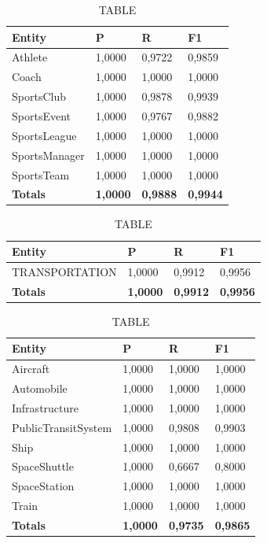 \documentclass[thesis=M,english]{FITthesis}[2018/05/30]
\begin{document}
	\begin{table}[H]\centering
		\caption{TABLE}
		\label{}
		\begin{tabular}{|l|l|l|l|}
			\hline {\textbf{Entity}} & {\textbf{P}} & {\textbf{R}} & {\textbf{F1}}\\\hline
				Athlete & 1,0000 & 0,9722 & 0,9859\\
				Coach & 1,0000 & 1,0000 & 1,0000\\
				SportsClub & 1,0000 & 0,9878 & 0,9939\\
				SportsEvent & 1,0000 & 0,9767 & 0,9882\\
				SportsLeague & 1,0000 & 1,0000 & 1,0000\\
				SportsManager & 1,0000 & 1,0000 & 1,0000\\				
				SportsTeam & 1,0000 & 1,0000 & 1,0000\\\hline
				\textbf{Totals} & \textbf{1,0000} & \textbf{0,9888} & \textbf{0,9944}\\\hline
		\end{tabular}
	\end{table}	

	\begin{table}[H]\centering
		\caption{TABLE}
		\label{}
		\begin{tabular}{|l|l|l|l|}
			\hline {\textbf{Entity}} & {\textbf{P}} & {\textbf{R}} & {\textbf{F1}}\\\hline
				TRANSPORTATION & 1,0000 & 0,9912 & 0,9956\\\hline
				\textbf{Totals} & \textbf{1,0000} & \textbf{0,9912} & \textbf{0,9956}\\\hline
		\end{tabular}
	\end{table}
	
	
	\begin{table}[H]\centering
		\caption{TABLE}
		\label{}
		\begin{tabular}{|l|l|l|l|}
			\hline {\textbf{Entity}} & {\textbf{P}} & {\textbf{R}} & {\textbf{F1}}\\\hline
				Aircraft & 1,0000 & 1,0000 & 1,0000\\
				Automobile & 1,0000 & 1,0000 & 1,0000\\				
				Infrastructure & 1,0000 & 1,0000 & 1,0000\\
				PublicTransitSystem & 1,0000 & 0,9808 & 0,9903\\
				Ship & 1,0000 & 1,0000 & 1,0000\\				
				SpaceShuttle & 1,0000 & 0,6667 & 0,8000\\
				SpaceStation & 1,0000 & 1,0000 & 1,0000\\
				Train & 1,0000 & 1,0000 & 1,0000\\\hline
				\textbf{Totals} & \textbf{1,0000} & \textbf{0,9735} & \textbf{0,9865}\\\hline
		\end{tabular}
	\end{table}	
\end{document}
